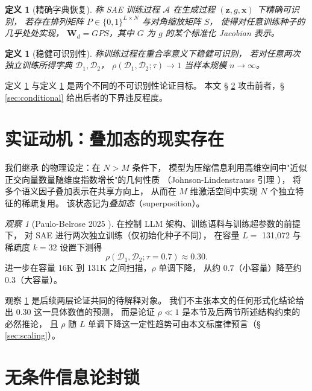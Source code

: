 \documentclass[11pt,a4paper]{article}
\newtheorem{definition}[theorem]{定义}
\theoremstyle{remark}
\newtheorem{observation}[theorem]{观察}
\newcommand{\Z}{\bm{z}}
\newcommand{\X}{\bm{x}}
\newcommand{\W}{\bm{W}}
\newcommand{\Dict}{\mathcal{D}}
\begin{document}
\begin{definition}[精确字典恢复]\label{def:exact}
称 SAE 训练过程 $\mathcal{A}$ 在生成过程 $(\Z, g, \X)$ 下\emph{精确可识别}，
若存在排列矩阵 $P \in \{0,1\}^{L \times N}$ 与对角缩放矩阵 $S$，
使得对任意训练种子的几乎处处实现，
$\W_d = G P S$，其中 $G$ 为 $g$ 的某个标准化 Jacobian 表示。
\end{definition}

\begin{definition}[稳健可识别性]\label{def:robust}
称训练过程在重合率意义下\emph{稳健可识别}，
若对任意两次独立训练所得字典 $\Dict_1, \Dict_2$，
$\rho(\Dict_1, \Dict_2; \tau) \to 1$ 当样本规模 $n \to \infty$。
\end{definition}

定义 \ref{def:exact} 与定义 \ref{def:robust} 是两个不同的不可识别性论证目标。
本文 § \ref{sec:unconditional} 攻击前者，§ \ref{sec:conditional} 给出后者的下界违反程度。

\section{实证动机：叠加态的现实存在}\label{sec:empirical}

我们继承 \cite{elhage2022} 的物理设定：在 $N > M$ 条件下，
模型为压缩信息利用高维空间中"近似正交向量数量随维度指数增长"的几何性质
（Johnson-Lindenstrauss 引理 \cite{johnson1984extensions}），
将多个语义因子叠加表示在共享方向上，
从而在 $M$ 维激活空间中实现 $N$ 个独立特征的稀疏复用。
该状态记为\emph{叠加态}（superposition）。

\begin{observation}[Paulo-Belrose 2025 \cite{paulo2025}]\label{obs:30pct}
在控制 LLM 架构、训练语料与训练超参数的前提下，
对 SAE 进行两次独立训练（仅初始化种子不同），
在容量 $L = $ 131{,}072 与稀疏度 $k = 32$ 设置下测得
\[
\rho(\Dict_1, \Dict_2; \tau=0.7) \approx 0.30.
\]
进一步在容量 16K 到 131K 之间扫描，$\rho$ 单调下降，
从约 $0.7$（小容量）降至约 $0.3$（大容量）。
\end{observation}

观察 \ref{obs:30pct} 是后续两层论证共同的待解释对象。
我们不主张本文的任何形式化结论给出 0.30 这一具体数值的预测，
而是论证 $\rho \ll 1$ 是本节及后两节所述结构约束的必然推论，
且 $\rho$ 随 $L$ 单调下降这一定性趋势可由本文标度律预言（§ \ref{sec:scaling}）。

\section{无条件信息论封锁}\label{sec:unconditional}
\end{document}
